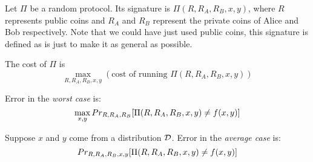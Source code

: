     \def\piprotocol{\Pi(R,R_A,R_B,x,y)}
    Let $\Pi$ be a random protocol. Its signature is $\piprotocol$, where $R$ represents public coins and $R_A$ and $R_B$ represent the private coins of Alice and Bob respectively.
    Note that we could have just used public coins, this signature is defined as is just to make it as general as possible.

    The cost of $\Pi$ is 
    \[ \max_{R,R_A,R_B,x,y} (\text{cost of running } \piprotocol) \]

    Error in the \textit{worst case} is:
    \[ \max_{x,y} \prob_{R,R_A,R_B} [ \piprotocol \neq f(x,y) ] \]

    Suppose $x$ and $y$ come from a distribution $\mathcal{D}$. Error in the \textit{average case} is:
    \[ \prob_{R,R_A,R_B,x,y} [ \piprotocol \neq f(x,y) ] \]

